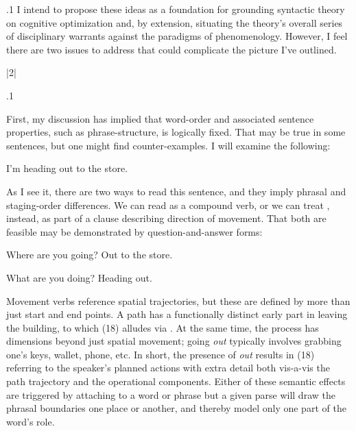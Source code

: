 \documentclass[11pt, twocolumn]{article}
\begin{document}
\p.1{%
I intend to propose these ideas as a foundation for
grounding syntactic theory on cognitive optimization
\mdash{} and, by extension, situating the theory's overall
series of disciplinary warrants against the paradigms
of phenomenology.  However, I feel there are two
issues to address that could complicate the picture I've outlined.
} %


\s|2|{}

\p.1{%
First, my discussion has implied that word-order and associated
sentence properties, such as phrase-structure, is logically
fixed.  That may be true in some sentences, but one might find
counter-examples.  I will examine the following:

\begin{exsGroup}

\exsItem{}   I'm heading out to the store.

\end{exsGroup}

\nip
As I see it, there are two ways to read this sentence, and they imply phrasal
and staging-order differences.  We can read  as a compound
verb, or we can treat , instead, as part of a clause describing
direction of movement.  That both are feasible may be demonstrated by
question-and-answer forms:

\begin{exsGroup}

\exsItem{}   Where are you going?  Out to the store.

\exsItem{}   What are you doing?  Heading out.

\end{exsGroup}

\nip
Movement verbs reference spatial trajectories, but these are
defined by more than just start and end points.  A path
 has a functionally distinct early part in leaving
the building, to which \exsRef(18) alludes via .  At the same time,
the process has dimensions beyond just spatial movement; going
\textit{out} typically involves grabbing one's keys, wallet, phone, etc.
In short, the presence of \textit{out} results in \exsRef(18) referring to
the speaker's planned actions with extra detail both vis-a-vis the
path trajectory and the operational components.  Either of these
semantic effects are triggered by attaching  to a word
or phrase \mdash{} but a given parse will draw the phrasal boundaries
one place or another, and thereby model only one part of the word's role.
} %
\end{document}
